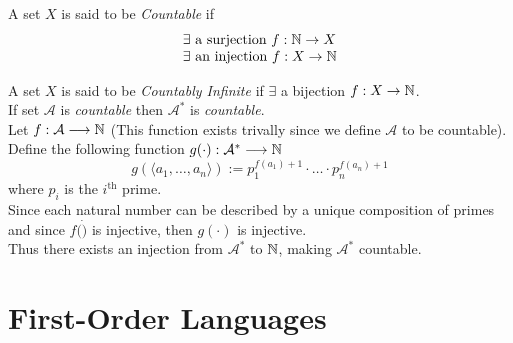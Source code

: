 \documentclass[11pt,a4paper]{article}
\begin{document}
A set $X$ is said to be \textit{Countable} if
\[\begin{array}{l}
\exists\text{ a surjection  }f:\mathbb{N}\to X\\
\exists\text{ an injection }f:X\to\mathbb{N}
\end{array}\]

A set $X$ is said to be \textit{Countably Infinite} if $\exists$ a bijection $f:X\to\mathbb{N}$.\\

If set $\mathcal{A}$ is \textit{countable} then $\mathcal{A}^*$ is \textit{countable}.\\

Let $f:\mathcal{A}\longrightarrow\mathbb{N}$ (This function exists trivally since we define $\mathcal{A}$ to be countable).\\
Define the following function $g(\cdot):\mathcal{A}^*\longrightarrow\mathbb{N}$
$$g(\langle a_1,\dots,a_n\rangle):=p_1^{f(a_1)+1}\cdot\dots\cdot p_n^{f(a_n)+1}$$
where $p_i$ is the $i^\text{th}$ prime.\\
Since each natural number can be described by a unique composition of primes and since $f(\dot)$ is injective, then $g(\cdot)$ is injective.\\
Thus there exists an injection from $\mathcal{A}^*$ to $\mathbb{N}$, making $\mathcal{A}^*$ countable.\\


\section{First-Order Languages}
\end{document}
